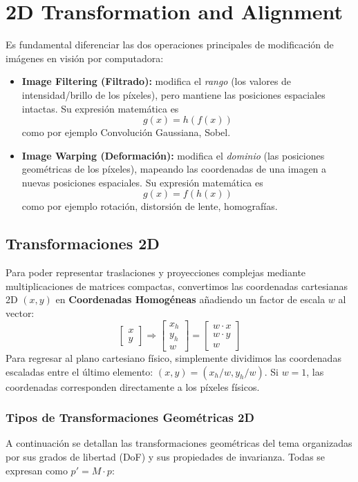 \chapter{2D Transformation and Alignment}

\noindent
Es fundamental diferenciar las dos operaciones principales de modificación de imágenes en visión por computadora:
\begin{itemize}
    \item \textbf{Image Filtering (Filtrado):} modifica el \textit{rango} (los valores de intensidad/brillo de los píxeles), pero mantiene las posiciones espaciales intactas. Su expresión matemática es 
    $$g(x) = h(f(x))$$
    como por ejemplo Convolución Gaussiana, Sobel.
    \item \textbf{Image Warping (Deformación):} modifica el \textit{dominio} (las posiciones geométricas de los píxeles), mapeando las coordenadas de una imagen a nuevas posiciones espaciales. Su expresión matemática es 
    $$g(x) = f(h(x))$$
    como por ejemplo rotación, distorsión de lente, homografías.
\end{itemize}


\section{Transformaciones 2D}
Para poder representar traslaciones y proyecciones complejas mediante multiplicaciones de matrices compactas, convertimos las coordenadas cartesianas 2D $(x, y)$ en \textbf{Coordenadas Homogéneas} añadiendo un factor de escala $w$ al vector:
$$\begin{bmatrix} x \\ y \end{bmatrix} \Longrightarrow \begin{bmatrix} x_h \\ y_h \\ w \end{bmatrix} = \begin{bmatrix} w \cdot x \\ w \cdot y \\ w \end{bmatrix}$$
Para regresar al plano cartesiano físico, simplemente dividimos las coordenadas escaladas entre el último elemento: $(x, y) = (x_h/w, y_h/w)$. Si $w=1$, las coordenadas corresponden directamente a los píxeles físicos.

\subsection{Tipos de Transformaciones Geométricas 2D}
\noindent
A continuación se detallan las transformaciones geométricas del tema organizadas por sus grados de libertad (DoF) y sus propiedades de invarianza. Todas se expresan como $p' = M \cdot p$:

